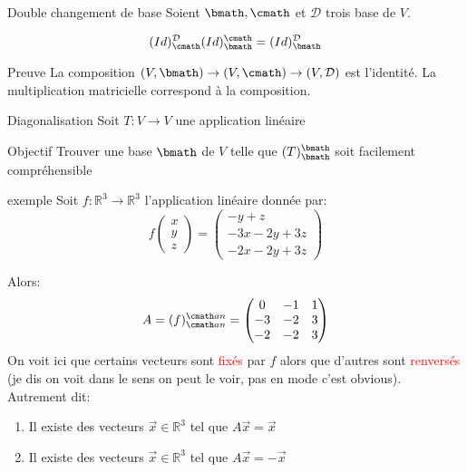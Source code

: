 \begin{parag}{Double changement de base}
    Soient $\bmath, \cmath$ et $\mathcal{D}$ trois base de $V$.
    \begin{formule}
        \[(Id)_\cmath^{\mathcal{D}}(Id)_\bmath^\cmath = (Id)_\bmath^{\mathcal{D}}\]
    \end{formule}
    \begin{subparag}{Preuve}
        La composition $(V, \bmath) \to (V, \cmath) \to (V, \mathcal{D})$ est l'identité. La multiplication matricielle correspond à la composition.
    \end{subparag}
\end{parag}

\begin{parag}{Diagonalisation}
    Soit $T: V \to V$ une application linéaire
    \begin{subparag}{Objectif}
        Trouver une base $\bmath$ de $V$ telle que $(T)_\bmath^\bmath$ soit facilement compréhensible
    \end{subparag}
    \begin{subparag}{exemple}
        Soit $f : \mathbb{R}^3 \to \mathbb{R}^3$ l'application linéaire donnée par:
        \[f\begin{pmatrix}
            x \\ y \\ z
        \end{pmatrix} = \begin{pmatrix}
            -y + z \\ -3x -2y + 3z\\
            -2x -2y + 3z
        \end{pmatrix}\]

        Alors:
        \[A = (f)_{\cmath an} ^{\cmath an} = \begin{pmatrix}
            0 & -1 & 1\\
            -3 & -2 & 3\\
            -2 & -2 & 3
        \end{pmatrix} \]
        On voit ici que certains vecteurs sont \textcolor{red}{fixés} par $f$ alors que d'autres sont \textcolor{red}{renversés} (je dis on voit dans le sens on peut le voir, pas en mode c'est obvious).\\
        Autrement dit:
        \begin{enumerate}
            \item Il existe des vecteurs $\vec{x} \in \mathbb{R}^3$ tel que $A\vec{x} = \vec{x}$
            \item Il existe des vecteurs $\vec{x} \in \mathbb{R}^3$ tel que $A\vec{x} = -\vec{x}$
        \end{enumerate}
        


\end{subparag}
\end{parag}
